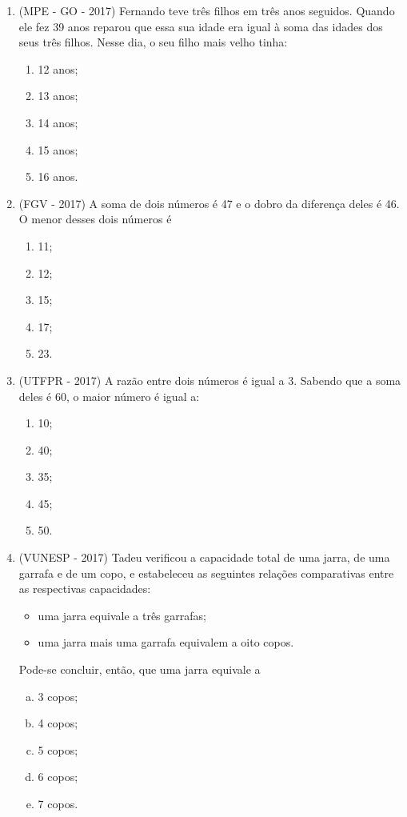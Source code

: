 \begin{enumerate}
\item (MPE - GO - 2017) Fernando teve três filhos em três anos seguidos. Quando ele fez 39 anos reparou que essa sua idade era igual à soma das idades dos seus três filhos. Nesse dia, o seu filho mais velho tinha:
\begin{enumerate}
\item 12 anos;
\item 13 anos;
\item 14 anos;
\item 15 anos;
\item 16 anos.
\end{enumerate}

\item (FGV - 2017) A soma de dois números é 47 e o dobro da diferença deles é 46. O menor desses dois números é
\begin{enumerate}
\item 11;
\item 12;
\item 15;
\item 17;
\item 23.
\end{enumerate}

\item (UTFPR - 2017) A razão entre dois números é igual a 3. Sabendo que a soma deles é 60, o maior número é igual a:
\begin{enumerate}
\item 10;
\item 40;
\item 35;
\item 45;
\item 50.
\end{enumerate}

\item (VUNESP - 2017) Tadeu verificou a capacidade total de uma jarra, de uma garrafa e de um copo, e estabeleceu as seguintes relações comparativas entre as respectivas capacidades:
\begin{itemize}
\item uma jarra equivale a três garrafas;
\item uma jarra mais uma garrafa equivalem a oito copos.
\end{itemize}
Pode-se concluir, então, que uma jarra equivale a
\begin{enumerate}[a)]
\item 3 copos;
\item 4 copos;
\item 5 copos;
\item 6 copos;
\item 7 copos.
\end{enumerate}


\end{enumerate}
